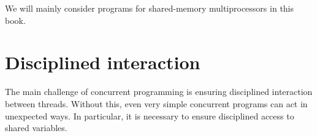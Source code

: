 








We will mainly consider programs for shared-memory multiprocessors in this
book.


\section{Disciplined interaction}

The main challenge of concurrent programming is ensuring disciplined
interaction between threads.  Without this, even very simple concurrent
programs can act in unexpected ways.  In particular, it is necessary to ensure
disciplined access to shared variables.

